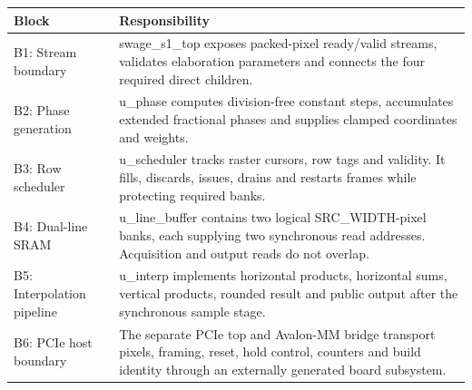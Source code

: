 \documentclass[11pt,a4paper]{article}
\begin{document}
{\small\renewcommand{\arraystretch}{1.18}\begin{longtable}{@{}L{0.24\textwidth}|L{0.7\textwidth}@{}}\toprule

\textbf{Block} & \textbf{Responsibility}\\\midrule\endhead

B1: Stream boundary & swage\_\allowbreak{}s1\_\allowbreak{}top exposes packed-pixel ready/\allowbreak{}valid streams,\allowbreak{} validates elaboration parameters and connects the four required direct children.\\[2pt]\hline

B2: Phase generation & u\_\allowbreak{}phase computes division-free constant steps,\allowbreak{} accumulates extended fractional phases and supplies clamped coordinates and weights.\\[2pt]\hline

B3: Row scheduler & u\_\allowbreak{}scheduler tracks raster cursors,\allowbreak{} row tags and validity. It fills,\allowbreak{} discards,\allowbreak{} issues,\allowbreak{} drains and restarts frames while protecting required banks.\\[2pt]\hline

B4: Dual-line SRAM & u\_\allowbreak{}line\_\allowbreak{}buffer contains two logical SRC\_\allowbreak{}WIDTH-pixel banks,\allowbreak{} each supplying two synchronous read addresses. Acquisition and output reads do not overlap.\\[2pt]\hline

B5: Interpolation pipeline & u\_\allowbreak{}interp implements horizontal products,\allowbreak{} horizontal sums,\allowbreak{} vertical products,\allowbreak{} rounded result and public output after the synchronous sample stage.\\[2pt]\hline

B6: PCIe host boundary & The separate PCIe top and Avalon-MM bridge transport pixels,\allowbreak{} framing,\allowbreak{} reset,\allowbreak{} hold control,\allowbreak{} counters and build identity through an externally generated board subsystem.\\[2pt]\hline

\bottomrule\end{longtable}}
\end{document}
